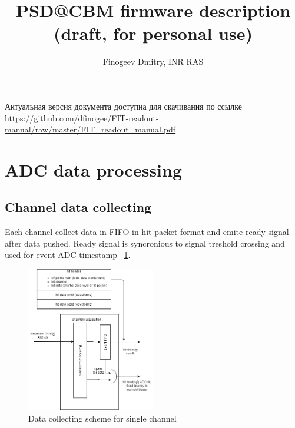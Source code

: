 \documentclass{article}
\title{PSD@CBM firmware description (draft, for personal use)}
\author{Finogeev Dmitry, INR RAS}
\begin{document}
\maketitle

Актуальная версия документа доступна для скачивания по ссылке
\newline
\url{https://github.com/dfinogee/FIT-readout-manual/raw/master/FIT_readout_manual.pdf}



\tableofcontents

\newpage

\section{ADC data processing}

\subsection{Channel data collecting}
Each channel collect data in FIFO in hit packet format and emite ready signal after data pushed. Ready signal is syncronious to signal treshold crossing and used for event ADC timestamp ~\ref{fig:1}.


\begin{figure}[H]
	\centering 
	\includegraphics[width=0.5\textwidth]{ADC_event_collection.png}
	\caption{\label{fig:1} Data collecting scheme for single channel}
\end{figure}
\end{document}
